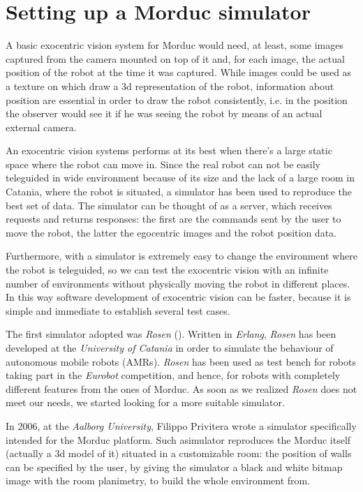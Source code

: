 \section{Setting up a Morduc simulator}
\label{sec:simulator}
A basic exocentric vision system for Morduc would need, 
at least, some images captured from the camera mounted 
on top of it and, for each image, the actual position of 
the robot at the time it was captured.
%
While images could be used as a texture on which draw 
a 3d representation of the robot, information about 
position are essential in order to draw the robot 
consistently, i.e. in the position the observer would 
see it if he was seeing the robot by means of an actual 
external camera.
%

%
An exocentric vision systems performs at its best 
when there's a large static space where the robot can move in. Since 
the real robot can not be easily teleguided in wide 
environment because of its size and the lack of a large 
room in Catania, where the robot is situated, a simulator 
has been used to reproduce the best set of data. The 
simulator can be thought of as a server, which receives 
requests and returns responses: the first are the commands 
sent by the user to move the robot, the latter the 
egocentric images and the robot position data.
%

%
Furthermore, with a simulator is extremely easy to 
change the environment where the robot is teleguided, 
so we can test the exocentric vision with an infinite 
number of environments without physically moving the 
robot in different places. In this way software 
development of exocentric vision can be faster, because 
it is simple and immediate to establish several test cases.
%

%
The first simulator adopted was \textit{Rosen} (\cite{rosen}). Written in 
\textit{Erlang}\cite{erlang}, \textit{Rosen} has been developed at
the \textit{University of Catania} in order to simulate the behaviour of
autonomous mobile robots (AMRs).
%
\textit{Rosen} has been used as test bench for robots taking part in 
the \textit{Eurobot} competition\cite{eurobot}, and hence, 
for robots with completely different features from the ones of Morduc. 
%
As soon as we realized \textit{Rosen} does not meet our needs, 
we started looking for a more suitable simulator.
%

%
In 2006, at the \textit{Aalborg University}, Filippo 
Privitera wrote a simulator specifically intended for 
the Morduc platform\cite{privitera}. 
%
Such asimulator reproduces the Morduc itself (actually a 
3d model of it) situated in a customizable room: the position 
of walls can be specified by the user, by giving 
the simulator a black and white bitmap image with the room 
planimetry, to build the whole environment from. 
%

